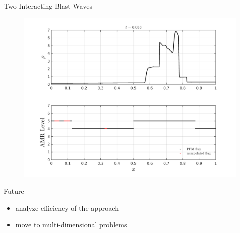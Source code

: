 \documentclass{beamer}
\begin{document}
\begin{frame}{Two Interacting Blast Waves}
  \begin{figure}
    \center
    \includegraphics[scale=0.4]{blast2_vlate.png}
  \end{figure}
\end{frame}

\begin{frame}{Future}
    \begin{itemize}
        \item<1-> analyze efficiency of the approach
        \item<2-> move to multi-dimensional problems
    \end{itemize}
\end{frame}
\end{document}
